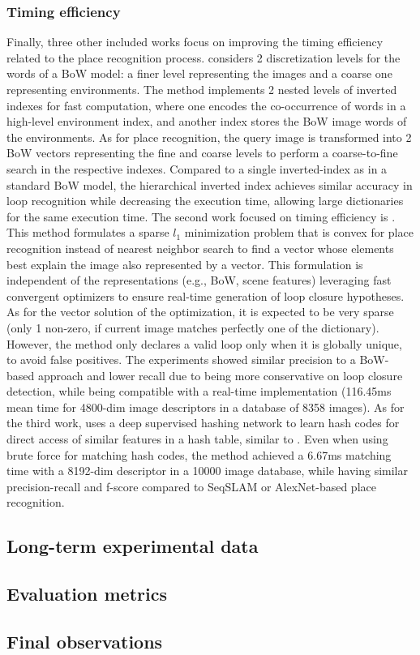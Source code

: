 \subsubsection{Timing efficiency}

Finally, three other included works focus on improving the timing efficiency related to the place recognition process.
\cite{mohan-et-al:2015:7139966} considers 2 discretization levels for the words of a BoW model: a finer level representing the images and a coarse one representing environments. The method implements 2 nested levels of inverted indexes for fast computation, where one encodes the co-occurrence of words in a high-level environment index, and another index stores the BoW image words of the environments. As for place recognition, the query image is transformed into 2 BoW vectors representing the fine and coarse levels to perform a coarse-to-fine search in the respective indexes. Compared to a single inverted-index as in a standard BoW model, the hierarchical inverted index achieves similar accuracy in loop recognition while decreasing the execution time, allowing large dictionaries for the same execution time.
The second work focused on timing efficiency is \cite{latif-et-al:2017:016}. This method formulates a sparse $l_1$ minimization problem that is convex  for place recognition instead of nearest neighbor search to find a vector whose elements best explain the image also represented by a vector. This formulation is independent of the representations (e.g., BoW, scene features) leveraging fast convergent optimizers to ensure real-time generation of loop closure hypotheses. As for the vector solution of the optimization, it is expected to be very sparse (only 1 non-zero, if current image matches perfectly one of the dictionary). However, the method only declares a valid loop only when it is globally unique, to avoid false positives. The experiments showed similar precision to a BoW-based approach and lower recall due to being more conservative on loop closure detection, while being compatible with a real-time implementation (116.45ms mean time for 4800-dim image descriptors in a database of 8358 images).
As for the third work, \cite{wu-wu:2019:8968599} uses a deep supervised hashing network to learn hash codes for direct access of similar features in a hash table, similar to \cite{ikeda-tanaka:2010:5509579}. Even when using brute force for matching hash codes, the method achieved a 6.67ms matching time with a 8192-dim descriptor in a 10000 image database, while having similar precision-recall and f-score compared to SeqSLAM or AlexNet-based place recognition.





\subsection{Long-term experimental data}
\label{sec:discussion:experiments}



\subsection{Evaluation metrics}
\label{sec:discussion:metrics}

\subsection{Final observations}
\label{sec:discussion:observations}

